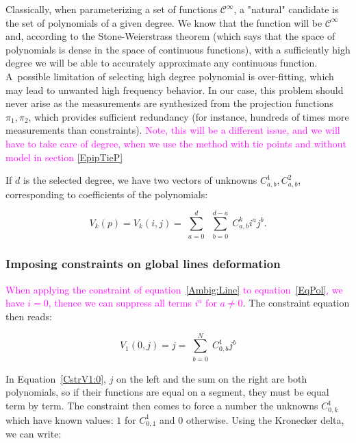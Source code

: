 \documentclass{ipol}
\newcommand{\mpd}[1]{\textcolor{magenta}{#1}}
\begin{document}
Classically, when parameterizing a set of functions  $\mathcal{C}^{\infty}$,
a "natural" candidate is the set of polynomials of a given degree. We know that the function will be
$\mathcal{C}^{\infty}$ and, according to the Stone-Weierstrass theorem \cite{Weierstrass1885,Stone1937} (which says that the space of polynomials is dense in the space of continuous functions),  with a sufficiently high
degree we will be able to accurately approximate any continuous function. A~possible
limitation of selecting high degree polynomial is over-fitting, which may lead to
unwanted high frequency behavior. In our case, this problem should never arise as the measurements  are synthesized from the projection functions $\pi_1,\pi_2$, which provides sufficient redundancy (for instance,
 hundreds of times more measurements than constraints). \mpd{Note, this will be a different issue,
and we will have to take care of degree, when we use
the method with tie points and without model in section \ref{EpipTieP}}

If $d$ is the selected degree, we have two vectors of unknowns $C^1_{a,b},C^2_{a,b}$, 
corresponding to coefficients of the polynomials:


\begin{equation}
   V_k(p) = V_k(i,j) =  \sum\limits_{\substack{a=0}}^d  \sum\limits_{\substack{b=0}}^{d-a}  C^k_{a,b}  i^a j^b. \label{EqPol}
\end{equation}
   
\subsubsection{Imposing constraints on global lines deformation}

\mpd{When applying the constraint of equation~\eqref{Ambig:Line} to equation~\eqref{EqPol}, 
we have $i=0$, thence we can suppress all terms  $i^a$ for $a\neq 0$}. The constraint equation then reads:


\begin{equation}
    V_1(0,j) =  j =   \sum\limits_{\substack{b=0}}^{N}  C^1_{0,b}  j^b  \label{CstrV1:0}
\end{equation}

In Equation~\eqref{CstrV1:0}, $j$ on the left and the  sum on the right are both polynomials, so if their functions are equal on a segment, they
must be equal term by term. The constraint then comes to force a number the
unknowns $C^1_{0,k}$ which have known values: $1$ for $C^1_{0,1}$ and $0$ otherwise.
Using the Kronecker delta, we can write:
\end{document}
